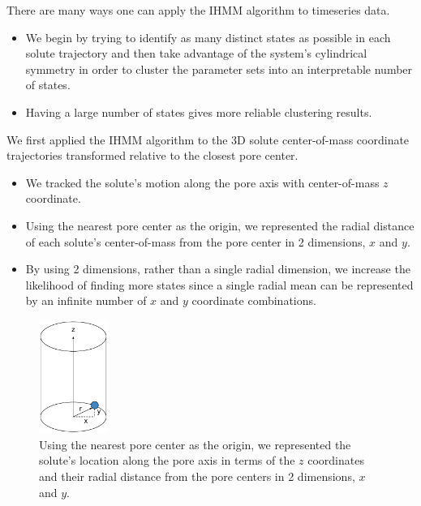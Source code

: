 \documentclass{article}
\begin{document}
  There are many ways one can apply the IHMM algorithm to timeseries data. 
  \begin{itemize}
    \item We begin by trying to identify as many distinct states as possible
    in each solute trajectory and then take advantage of the system's cylindrical
    symmetry in order to cluster the parameter sets into an interpretable number
    of states.
    \item Having a large number of states gives more reliable clustering results.
  \end{itemize}
  
  We first applied the IHMM algorithm to the 3D solute center-of-mass coordinate 
  trajectories transformed relative to the closest pore center.
  \begin{itemize}
    \item We tracked the solute's motion along the pore axis with center-of-mass
    $z$ coordinate.
    \item Using the nearest pore center as the origin, we represented the radial 
    distance of each solute's center-of-mass from the pore center in 2 dimensions,
    $x$ and $y$.
    \item By using 2 dimensions, rather than a single radial dimension, we
    increase the likelihood of finding more states since a single radial
    mean can be represented by an infinite number of $x$ and $y$ coordinate combinations.
  \end{itemize}
  
  \begin{figure}
  \centering
  \includegraphics[width=0.2\textwidth]{cartesian_cylinder.pdf}
  \caption{Using the nearest pore center as the origin, we represented the solute's
  location along the pore axis in terms of the $z$ coordinates and their radial distance
  from the pore centers in 2 dimensions, $x$ and $y$.}\label{fig:cartesian_cylinder}
  \end{figure}
  
\end{document}
